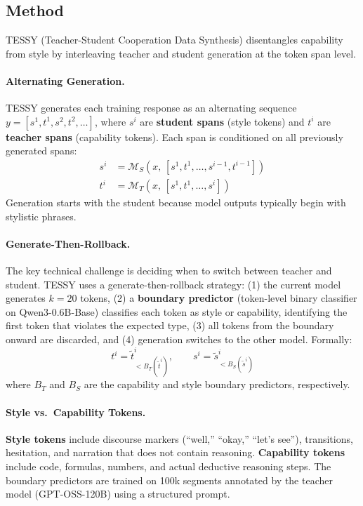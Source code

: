 \documentclass[11pt]{article}
\begin{document}
\subsection{Method}

TESSY (Teacher-Student Cooperation Data Synthesis) disentangles capability from style by interleaving teacher and student generation at the token span level.

\paragraph{Alternating Generation.}
TESSY generates each training response as an alternating sequence $y = [s^1, t^1, s^2, t^2, \ldots]$, where $s^i$ are \textbf{student spans} (style tokens) and $t^i$ are \textbf{teacher spans} (capability tokens). Each span is conditioned on all previously generated spans:
\begin{align}
    s^i &= \mathcal{M}_S\!\left(x,\, [s^1, t^1, \ldots, s^{i-1}, t^{i-1}]\right) \\
    t^i &= \mathcal{M}_T\!\left(x,\, [s^1, t^1, \ldots, s^i]\right)
\end{align}
Generation starts with the student because model outputs typically begin with stylistic phrases.

\paragraph{Generate-Then-Rollback.}
The key technical challenge is deciding when to switch between teacher and student. TESSY uses a generate-then-rollback strategy: (1) the current model generates $k = 20$ tokens, (2) a \textbf{boundary predictor} (token-level binary classifier on Qwen3-0.6B-Base) classifies each token as style or capability, identifying the first token that violates the expected type, (3) all tokens from the boundary onward are discarded, and (4) generation switches to the other model. Formally:
\begin{equation}
    t^i = \tilde{t}^i_{<B_T(\tilde{t}^i)}, \qquad s^i = \tilde{s}^i_{<B_S(\tilde{s}^i)}
\end{equation}
where $B_T$ and $B_S$ are the capability and style boundary predictors, respectively.

\paragraph{Style vs.\ Capability Tokens.}
\textbf{Style tokens} include discourse markers (``well,'' ``okay,'' ``let's see''), transitions, hesitation, and narration that does not contain reasoning. \textbf{Capability tokens} include code, formulas, numbers, and actual deductive reasoning steps. The boundary predictors are trained on 100k segments annotated by the teacher model (GPT-OSS-120B) using a structured prompt.
\end{document}
